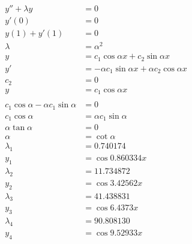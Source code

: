 \documentclass{article}
\begin{document}
\begin{align*}
  y'' + \lambda y                          & = 0                                                    \\
  y'(0)                                    & = 0                                                    \\
  y(1) + y'(1)                             & = 0                                                    \\
  \lambda                                  & = \alpha^2                                             \\
  y                                        & = c_1 \cos \alpha x + c_2 \sin \alpha x                \\
  y'                                       & = -\alpha c_1 \sin \alpha x + \alpha c_2 \cos \alpha x \\
  c_2                                      & = 0                                                    \\
  y                                        & = c_1 \cos \alpha x                                    \\ \\
  c_1 \cos \alpha - \alpha c_1 \sin \alpha & = 0                                                    \\
  c_1 \cos \alpha                          & = \alpha c_1 \sin \alpha                               \\
  \alpha \tan \alpha                       & = 0                                                    \\
  \alpha                                   & = \cot \alpha                                          \\
  \lambda_1                                & = 0.740174                                             \\
  y_1                                      & = \cos 0.860334 x                                      \\
  \lambda_2                                & = 11.734872                                            \\
  y_2                                      & = \cos 3.42562 x                                       \\
  \lambda_3                                & = 41.438831                                            \\
  y_3                                      & = \cos 6.4373 x                                        \\
  \lambda_4                                & = 90.808130                                            \\
  y_4                                      & = \cos 9.52933 x
\end{align*}
\end{document}
